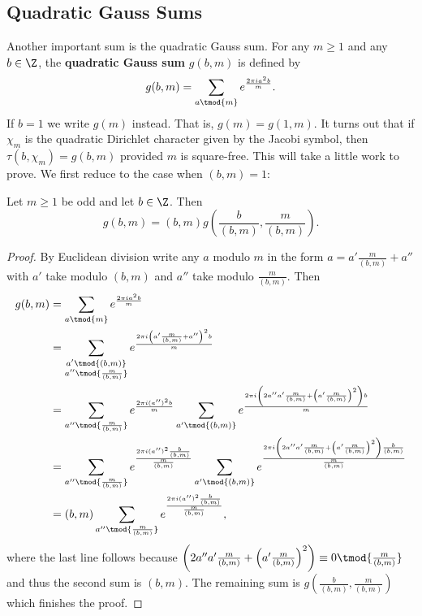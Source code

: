       \subsection*{Quadratic Gauss Sums}
        Another important sum is the quadratic Gauss sum. For any $m \ge 1$ and any $b \in \Z$, the \textbf{quadratic Gauss sum} $g(b,m)$ is defined by
        \[
          g(b,m) = \sum_{a \tmod{m}}e^{\frac{2\pi ia^{2}b}{m}}.
        \]
        If $b = 1$ we write $g(m)$ instead. That is, $g(m) = g(1,m)$. It turns out that if $\chi_{m}$ is the quadratic Dirichlet character given by the Jacobi symbol, then $\tau(b,\chi_{m}) = g(b,m)$ provided $m$ is square-free. This will take a little work to prove. We first reduce to the case when $(b,m) = 1$:

        \begin{proposition}\label{prop:quadratic_Gauss_sum_relatively_prime_reduction}
          Let $m \ge 1$ be odd and let $b \in \Z$. Then
          \[
            g(b,m) = (b,m)g\left(\frac{b}{(b,m)},\frac{m}{(b,m)}\right).
          \]
        \end{proposition}
        \begin{proof}
          By Euclidean division write any $a$ modulo $m$ in the form $a = a'\frac{m}{(b,m)}+a''$ with $a'$ take modulo $(b,m)$ and $a''$ take modulo $\frac{m}{(b,m)}$. Then
          \begin{align*}
            g(b,m) &= \sum_{a \tmod{m}}e^{\frac{2\pi ia^{2}b}{m}} \\
            &= \sum_{\substack{a' \tmod{(b,m)} \\ a'' \tmod{\frac{m}{(b,m)}}}}e^{\frac{2\pi i\left(a'\frac{m}{(b,m)}+a''\right)^{2}b}{m}} \\
            &= \sum_{a'' \tmod{\frac{m}{(b,m)}}}e^{\frac{2\pi i(a'')^{2}b}{m}}\sum_{a' \tmod{(b,m)}}e^{\frac{2\pi i\left(2a''a'\frac{m}{(b,m)}+\left(a'\frac{m}{(b,m)}\right)^{2}\right)b}{m}} \\
            &= \sum_{a'' \tmod{\frac{m}{(b,m)}}}e^{\frac{2\pi i(a'')^{2}\frac{b}{(b,m)}}{\frac{m}{(b,m)}}}\sum_{a' \tmod{(b,m)}}e^{\frac{2\pi i\left(2a''a'\frac{m}{(b,m)}+\left(a'\frac{m}{(b,m)}\right)^{2}\right)\frac{b}{(b,m)}}{\frac{m}{(b,m)}}} \\
            &= (b,m)\sum_{a'' \tmod{\frac{m}{(b,m)}}}e^{\frac{2\pi i(a'')^{2}\frac{b}{(b,m)}}{\frac{m}{(b,m)}}},
          \end{align*}
          where the last line follows because $\left(2a''a'\frac{m}{(b,m)}+\left(a'\frac{m}{(b,m)}\right)^{2}\right) \equiv 0 \tmod{\frac{m}{(b,m)}}$ and thus the second sum is $(b,m)$. The remaining sum is $g\left(\frac{b}{(b,m)},\frac{m}{(b,m)}\right)$ which finishes the proof.
        \end{proof}

